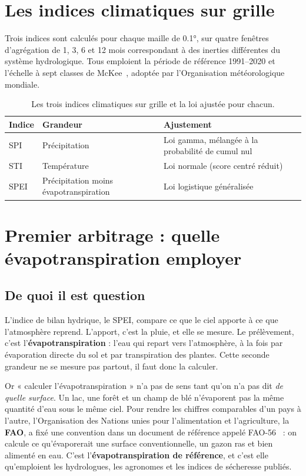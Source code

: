 \section{Les indices climatiques sur grille}

Trois indices sont calculés pour chaque maille de \ang{0.1}, sur quatre fenêtres d'agrégation de
1, 3, 6 et 12 mois correspondant à des inerties différentes du système hydrologique. Tous
emploient la période de référence 1991--2020 et l'échelle à sept classes de
McKee~\cite{mckee1993spi}, adoptée par l'Organisation météorologique mondiale.

\begin{table}[H]
\centering
\caption{Les trois indices climatiques sur grille et la loi ajustée pour chacun.}
\label{tab:indices-grille}
\begin{tabularx}{\textwidth}{@{}llX@{}}
\toprule
\textbf{Indice} & \textbf{Grandeur} & \textbf{Ajustement} \\
\midrule
SPI  & Précipitation & Loi gamma, mélangée à la probabilité de cumul nul \\
STI  & Température & Loi normale (score centré réduit) \\
SPEI & Précipitation moins évapotranspiration & Loi logistique généralisée \\
\bottomrule
\end{tabularx}
\end{table}

\section{Premier arbitrage : quelle évapotranspiration employer}
\label{sec:hargreaves}

\subsection{De quoi il est question}

L'indice de bilan hydrique, le SPEI, compare ce que le ciel apporte à ce que l'atmosphère
reprend. L'apport, c'est la pluie, et elle se mesure. Le prélèvement, c'est
l'\textbf{évapotranspiration} : l'eau qui repart vers l'atmosphère, à la fois par évaporation
directe du sol et par transpiration des plantes. Cette seconde grandeur ne se mesure pas
partout, il faut donc la calculer.

Or « calculer l'évapotranspiration » n'a pas de sens tant qu'on n'a pas dit \emph{de quelle
surface}. Un lac, une forêt et un champ de blé n'évaporent pas la même quantité d'eau sous le
même ciel. Pour rendre les chiffres comparables d'un pays à l'autre, l'Organisation des Nations
unies pour l'alimentation et l'agriculture, la \textbf{FAO}, a fixé une convention dans un
document de référence appelé FAO-56~\cite{allen1998fao56} : on calcule ce qu'évaporerait une
surface conventionnelle, un gazon ras et bien alimenté en eau. C'est
l'\textbf{évapotranspiration de référence}, et c'est elle qu'emploient les hydrologues,
les agronomes et les indices de sécheresse publiés.


